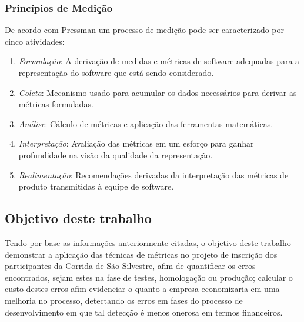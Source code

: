 \documentclass[11pt, a4paper]{article}
\begin{document}
\subsubsection{Princípios de Medição}
De acordo com Pressman um processo de medição pode ser caracterizado por cinco atividades:

\begin{enumerate}
	\item \textit{Formulação}: A derivação de medidas e métricas de software adequadas para a representação do software que está sendo considerado.
	\item \textit{Coleta}: Mecanismo usado para acumular os dados necessários para derivar as métricas formuladas.
	\item \textit{Análise}: Cálculo de métricas e aplicação das ferramentas matemáticas.
	\item \textit{Interpretação}: Avaliação das métricas em um esforço para ganhar profundidade na visão da qualidade da representação.
	\item \textit{Realimentação}: Recomendações derivadas da interpretação das métricas de produto transmitidas à equipe de software.
\end{enumerate}
\cite[p.353]{pressman}





\subsection{Objetivo deste trabalho}
Tendo por base as informações anteriormente citadas, o objetivo deste trabalho demonstrar a aplicação das técnicas de métricas no projeto de inscrição dos participantes da Corrida de São Silvestre, afim de quantificar os erros encontrados, sejam estes na fase de testes, homologação ou produção; calcular o custo destes erros afim evidenciar o quanto a empresa economizaria em uma melhoria no processo, detectando os erros em fases do processo de desenvolvimento em que tal detecção é menos onerosa em termos financeiros.
\end{document}
